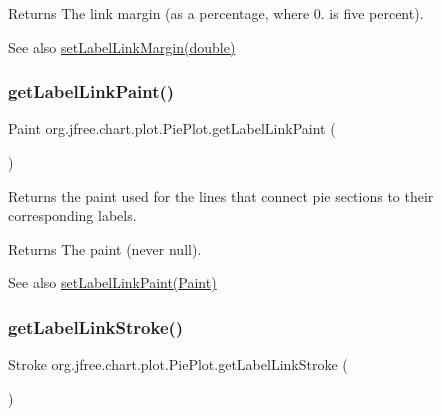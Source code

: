 \begin{DoxyReturn}{Returns}
The link margin (as a percentage, where 0. is five percent).
\end{DoxyReturn}
\begin{DoxySeeAlso}{See also}
\mbox{\hyperlink{classorg_1_1jfree_1_1chart_1_1plot_1_1_pie_plot_a62c82b17fba28898ef0109e07774443a}{set\+Label\+Link\+Margin(double)}} 
\end{DoxySeeAlso}
\mbox{\label{classorg_1_1jfree_1_1chart_1_1plot_1_1_pie_plot_a353bf3cd5156533feab1e40e58a6f64a}} 
\subsubsection{\texorpdfstring{get\+Label\+Link\+Paint()}{getLabelLinkPaint()}}
{\footnotesize\ttfamily Paint org.\+jfree.\+chart.\+plot.\+Pie\+Plot.\+get\+Label\+Link\+Paint (\begin{DoxyParamCaption}{ }\end{DoxyParamCaption})}

Returns the paint used for the lines that connect pie sections to their corresponding labels.

\begin{DoxyReturn}{Returns}
The paint (never {\ttfamily null}).
\end{DoxyReturn}
\begin{DoxySeeAlso}{See also}
\mbox{\hyperlink{classorg_1_1jfree_1_1chart_1_1plot_1_1_pie_plot_a50d9df69250b68383bf036eb30e396cc}{set\+Label\+Link\+Paint(\+Paint)}} 
\end{DoxySeeAlso}
\mbox{\label{classorg_1_1jfree_1_1chart_1_1plot_1_1_pie_plot_a9b1859596be7e3bf95be63ee3c08134c}} 
\subsubsection{\texorpdfstring{get\+Label\+Link\+Stroke()}{getLabelLinkStroke()}}
{\footnotesize\ttfamily Stroke org.\+jfree.\+chart.\+plot.\+Pie\+Plot.\+get\+Label\+Link\+Stroke (\begin{DoxyParamCaption}{ }\end{DoxyParamCaption})}

